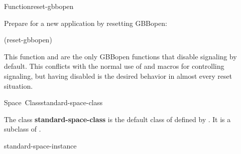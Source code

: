 \documentclass[10pt,twoside,english,pdftex]{article}
\begin{document}
\begin{functiondoc}{Function}{reset-gbbopen}
\fnexample

Prepare for a new application by resetting GBBopen:
%
\W\supp
\begin{example}
  (reset-gbbopen)
\end{example}

\fnnote 
{}%
%
This function and \textbf{} are the only
GBBopen functions that disable  signaling by default.  This
conflicts with the normal use of \textbf{}
and \textbf{} macros for controlling
 signaling, but having  disabled is the desired
behavior in almost every reset situation.

\end{functiondoc}


\begin{functiondoc}{Space~Class}{standard-space-class}{}
%
%
%
  
\fnsyntax

\fnpackage {}

\fnmodule {}

\fndescription 
{}%
%
The class \textbf{standard-space-class} is the default class of
 defined by \textbf{}.
It is a subclass of \textbf{}.

\begin{alsos}{standard-space-instance}
\end{alsos}

\end{functiondoc}

\end{document}
